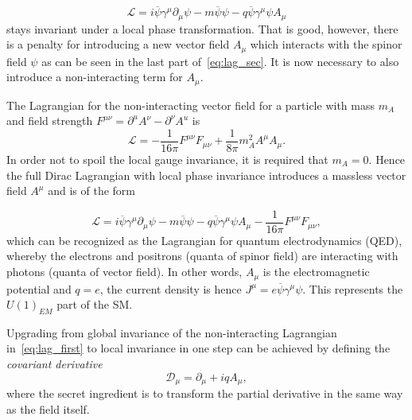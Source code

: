 \begin{equation}
	\mathcal{L} = i\overline{\psi}\gamma^{\mu}\partial_{\mu}\psi - m\overline{\psi}\psi - q\overline{\psi}\gamma^{\mu}\psi A_{\mu}
\label{eq:lag_sec}
\end{equation}
stays invariant under a local phase transformation. That is good, however, there is a penalty for introducing a new vector field $A_{\mu}$ which interacts with the spinor field $\psi$ as can be seen in the last part of~\autoref{eq:lag_sec}. It is now necessary to also introduce a non-interacting term for $A_{\mu}$.

The Lagrangian for the non-interacting vector field for a particle with mass $m_{A}$ and field strength $F^{\mu\nu}=\partial^{u}A^{\nu} - \partial^{\nu}A^{u}$ is
\begin{equation}
\mathcal{L}= -\frac{1}{16\pi} F^{\mu\nu}F_{\mu\nu} + \frac{1}{8\pi}m_{A}^{2}A^{\mu}A_{\mu}.
\end{equation}
In order not to spoil the local gauge invariance, it is required that $m_{A}=0$. Hence the full Dirac Lagrangian with local phase invariance introduces a massless vector field $A^{\mu}$ and is of the form

\begin{equation}
	\mathcal{L} = i\overline{\psi}\gamma^{\mu}\partial_{\mu}\psi - m\overline{\psi}\psi - q\overline{\psi}\gamma^{\mu}\psi A_{\mu} -\frac{1}{16\pi} F^{\mu\nu}F_{\mu\nu},
\label{eq:lag_thir}
\end{equation}
which can be recognized as the Lagrangian for quantum electrodynamics (\gls{QED}), whereby the electrons and positrons (quanta of spinor field) are interacting with photons (quanta of vector field). In other words, $A_{\mu}$ is the electromagnetic potential and $q=e$, the current density is hence $J^{\mu}=e\overline{\psi}\gamma^{\mu}\psi$. This represents the $U(1)_{EM}$ part of the SM.

Upgrading from global invariance of the non-interacting Lagrangian in~\autoref{eq:lag_first} to local invariance in one step can be achieved by defining the \textit{covariant derivative}
\begin{equation}
	\mathcal{D}_{\mu} = \partial_{\mu}+ iqA_{\mu},
\end{equation}
where the secret ingredient is to transform the partial derivative in the same way as the field itself.%

